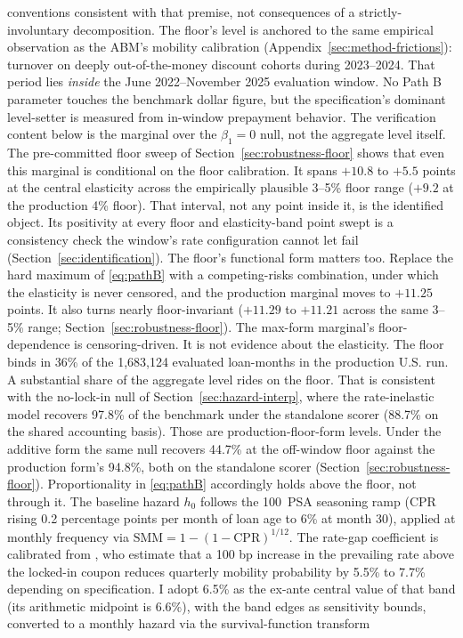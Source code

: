 \documentclass[12pt]{article}
\begin{document}
conventions consistent with that premise, not consequences of a strictly-involuntary decomposition. The floor's level is anchored to the same empirical observation as the ABM's mobility calibration (Appendix~\ref{sec:method-frictions}): turnover on deeply out-of-the-money discount cohorts during 2023--2024. That period lies \emph{inside} the June 2022--November 2025 evaluation window. No Path B parameter touches the benchmark dollar figure, but the specification's dominant level-setter is measured from in-window prepayment behavior. The verification content below is the marginal over the $\beta_1 = 0$ null, not the aggregate level itself. The pre-committed floor sweep of Section~\ref{sec:robustness-floor} shows that even this marginal is conditional on the floor calibration. It spans $+10.8$ to $+5.5$ points at the central elasticity across the empirically plausible 3--5\% floor range ($+9.2$ at the production 4\% floor). That interval, not any point inside it, is the identified object. Its positivity at every floor and elasticity-band point swept is a consistency check the window's rate configuration cannot let fail (Section~\ref{sec:identification}). The floor's functional form matters too. Replace the hard maximum of \eqref{eq:pathB} with a competing-risks combination, under which the elasticity is never censored, and the production marginal moves to $+11.25$ points. It also turns nearly floor-invariant ($+11.29$ to $+11.21$ across the same 3--5\% range; Section~\ref{sec:robustness-floor}). The max-form marginal's floor-dependence is censoring-driven. It is not evidence about the elasticity. The floor binds in 36\% of the 1,683,124 evaluated loan-months in the production U.S. run. A substantial share of the aggregate level rides on the floor. That is consistent with the no-lock-in null of Section~\ref{sec:hazard-interp}, where the rate-inelastic model recovers 97.8\% of the benchmark under the standalone scorer (88.7\% on the shared accounting basis). Those are production-floor-form levels. Under the additive form the same null recovers 44.7\% at the off-window floor against the production form's 94.8\%, both on the standalone scorer (Section~\ref{sec:robustness-floor}). Proportionality in \eqref{eq:pathB} accordingly holds above the floor, not through it. The baseline hazard $h_0$ follows the 100~PSA seasoning ramp (CPR rising 0.2 percentage points per month of loan age to 6\% at month 30), applied at monthly frequency via $\mathrm{SMM} = 1-(1-\mathrm{CPR})^{1/12}$. The rate-gap coefficient is calibrated from \citet{liebersohn2024}, who estimate that a 100 bp increase in the prevailing rate above the locked-in coupon reduces quarterly mobility probability by 5.5\% to 7.7\% depending on specification. I adopt 6.5\% as the ex-ante central value of that band (its arithmetic midpoint is 6.6\%), with the band edges as sensitivity bounds, converted to a monthly hazard via the survival-function transform
\end{document}
